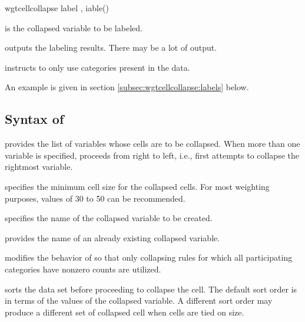 \begin{stsyntax}
wgtcellcollapse label
,
iable(\varname)
\end{stsyntax}

\hangpara
{} is the collapsed variable to be labeled.

\hangpara
{} outputs the labeling results. There may be a lot of output.

\hangpara
{} instructs  to only use categories present in the data.

An example is given in section \ref{subsec:wgtcellcollapse:labels} below.

\subsection{Syntax of }


\hangpara
{} provides the list of variables whose cells are to be collapsed.
When more than one variable is specified,  proceeds from right to left,
i.e., first attempts to collapse the rightmost variable.

\hangpara
{} specifies the minimum cell size for the collapsed cells. For most weighting
purposes, values of 30 to 50 can be recommended.

\hangpara
{} specifies the name of the collapsed variable to be created.

\hangpara
{} provides the name of an already existing collapsed variable.

\hangpara
{} modifies the behavior of  so that only
collapsing rules for which all participating categories have nonzero counts are utilized.

\hangpara
{} sorts the data set before proceeding to collapse the cell.
The default sort order is in terms of the values of the collapsed variable.
A different sort order may produce a different set of collapsed cell when
cells are tied on size.

